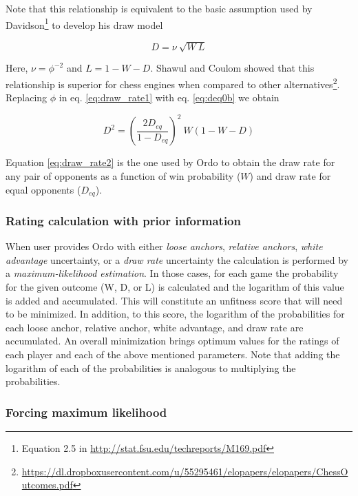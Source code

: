 \documentclass[12pt]{article}
\begin{document}
Note that this relationship is equivalent to the basic assumption used by Davidson\footnote{Equation 2.5 in \url{http://stat.fsu.edu/techreports/M169.pdf}} to develop his draw model

	\begin{equation} \label{eq:drawrate_davidson}
	D = \nu\: \sqrt{W \: L}  
	\end{equation}

Here, $\nu = \phi^{-2}$ and $L = 1 - W - D$. Shawul and Coulom showed that this relationship is superior for chess engines when compared to other alternatives\footnote{\url{https://dl.dropboxusercontent.com/u/55295461/elopapers/elopapers/ChessOutcomes.pdf}}.
Replacing $\phi$ in eq. \ref{eq:draw_rate1} with eq. \ref{eq:deq0b} we obtain

	\begin{equation} \label{eq:draw_rate2}
	D^2 = \left(\frac{2 D_{eq}}{1-D_{eq}}\right)^2\: W (1 - W - D)  
	\end{equation}

Equation \ref{eq:draw_rate2} is the one used by Ordo to obtain the draw rate for any pair of opponents as a function of win probability ($W$) and draw rate for equal opponents ($D_{eq}$).



\subsubsection*{Rating calculation with prior information}

When user provides Ordo with either \textit{loose anchors}, \textit{relative anchors}, \textit{white advantage} uncertainty, or a \textit{draw rate} uncertainty the calculation is performed by a \textit{maximum-likelihood estimation}.
In those cases, for each game the probability for the given outcome (W, D, or L) is calculated and the logarithm of this value is added and accumulated.
This will constitute an unfitness score that will need to be minimized.
In addition, to this score, the logarithm of the probabilities for each loose anchor, relative anchor, white advantage, and draw rate are accumulated.
An overall minimization brings optimum values for the ratings of each player and each of the above mentioned parameters. 
Note that adding the logarithm of each of the probabilities is analogous to multiplying the probabilities.

\subsubsection*{Forcing maximum likelihood}
\end{document}
